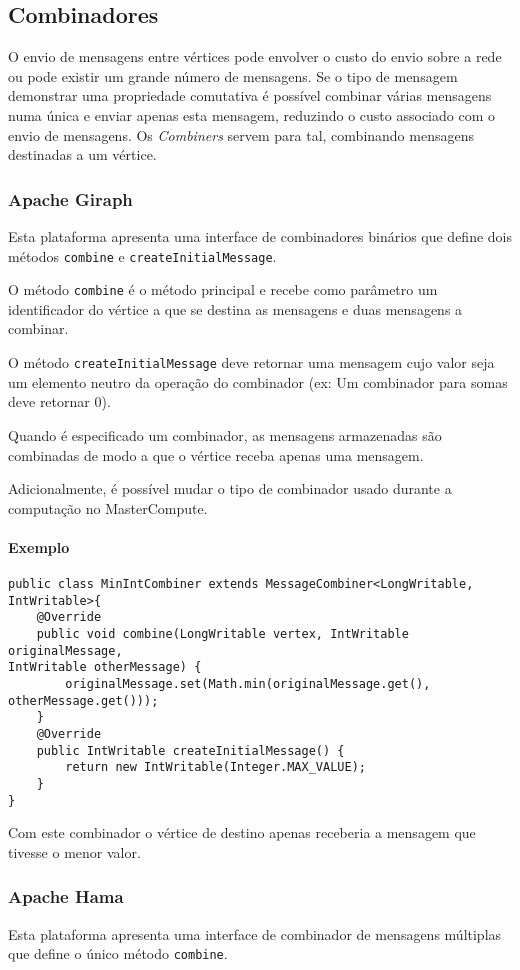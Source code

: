 \subsection{Combinadores}
O envio de mensagens entre vértices pode envolver o custo do envio sobre a rede ou pode existir um grande número de mensagens. Se o tipo de mensagem demonstrar uma propriedade comutativa é possível combinar várias mensagens numa única e enviar apenas esta mensagem, reduzindo o custo associado com o envio de mensagens. Os \textit{Combiners} servem para tal, combinando mensagens destinadas a um vértice.

\subsubsection*{Apache Giraph}
Esta plataforma apresenta uma interface de combinadores binários que define dois métodos \texttt{combine} e \texttt{createInitialMessage}.

O método \texttt{combine} é o método principal e recebe como parâmetro um identificador do vértice a que se destina as mensagens e duas mensagens a combinar.

O método \texttt{createInitialMessage} deve retornar uma mensagem cujo valor seja um elemento neutro da operação do combinador (ex: Um combinador para somas deve retornar 0).

Quando é especificado um combinador, as mensagens armazenadas são combinadas de modo a que o vértice receba apenas uma mensagem.

Adicionalmente, é possível mudar o tipo de combinador usado durante a computação no MasterCompute.

\paragraph{Exemplo}
\begin{verbatim}
public class MinIntCombiner extends MessageCombiner<LongWritable, IntWritable>{
	@Override
	public void combine(LongWritable vertex, IntWritable originalMessage, 
IntWritable otherMessage) {
		originalMessage.set(Math.min(originalMessage.get(), 
otherMessage.get()));
	}
	@Override
	public IntWritable createInitialMessage() {
		return new IntWritable(Integer.MAX_VALUE);
	}
}
\end{verbatim}

Com este combinador o vértice de destino apenas receberia a mensagem que 
tivesse o menor valor.

\subsubsection*{Apache Hama}
Esta plataforma apresenta uma interface de combinador de mensagens múltiplas que define o único método \texttt{combine}.

